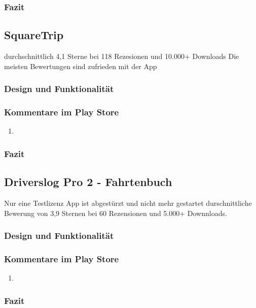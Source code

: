 \documentclass[a4paper]{article}
\begin{document}
\subsubsection{Fazit}

\subsection{SquareTrip}
durchschnittlich 4,1 Sterne bei 118 Rezesionen und 10.000+ Downloads
Die meisten Bewertungen sind zufrieden mit der App

\subsubsection{Design und Funktionalität}

\subsubsection{Kommentare im Play Store}
\begin{enumerate}
    \item
\end{enumerate}

\subsubsection{Fazit}

\subsection{Driverslog Pro 2 - Fahrtenbuch}
Nur eine Testlizenz
App ist abgestürzt und nicht mehr gestartet
durschnittliche Bewerung von 3,9 Sternen bei 60 Rezensionen und 5.000+ Downnloads.

\subsubsection{Design und Funktionalität}

\subsubsection{Kommentare im Play Store}
\begin{enumerate}
    \item
\end{enumerate}

\subsubsection{Fazit}
\end{document}
